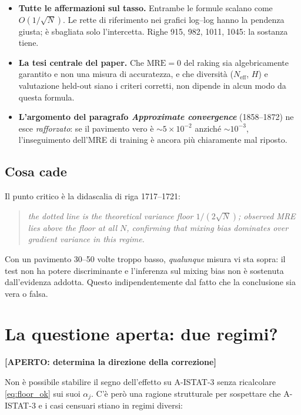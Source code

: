 \documentclass[11pt,a4paper]{article}
\newcommand{\MRE}{\mathrm{MRE}}
\newcommand{\OPEN}[1]{\textcolor{orange!80!black}{\textbf{[APERTO: #1]}}}
\begin{document}
\begin{itemize}[leftmargin=*]
\item \textbf{Tutte le affermazioni sul tasso.} Entrambe le formule
  scalano come $O(1/\sqrt{N})$. Le rette di riferimento nei grafici
  log--log hanno la pendenza giusta; è sbagliata solo l'intercetta.
  Righe 915, 982, 1011, 1045: la sostanza tiene.
\item \textbf{La tesi centrale del paper.} Che $\MRE=0$ del raking sia
  algebricamente garantito e non una misura di accuratezza, e che
  diversità ($N_{\text{eff}}$, $H$) e valutazione held-out siano i
  criteri corretti, non dipende in alcun modo da questa formula.
\item \textbf{L'argomento del paragrafo \emph{Approximate
  convergence}} (1858--1872) ne esce \emph{rafforzato}: se il
  pavimento vero è $\sim\!5\times10^{-2}$ anziché $\sim\!10^{-3}$,
  l'inseguimento dell'MRE di training è ancora più chiaramente mal
  riposto.
\end{itemize}

\subsection{Cosa cade}

Il punto critico è la didascalia di riga 1717--1721:

\begin{quote}\itshape
the dotted line is the theoretical variance floor $1/(2\sqrt{N})$;
observed MRE lies above the floor at all $N$, confirming that mixing
bias dominates over gradient variance in this regime.
\end{quote}

Con un pavimento 30--50 volte troppo basso, \emph{qualunque} misura vi
sta sopra: il test non ha potere discriminante e l'inferenza sul
mixing bias non è sostenuta dall'evidenza addotta. Questo
indipendentemente dal fatto che la conclusione sia vera o falsa.

\section{La questione aperta: due regimi?}

\OPEN{determina la direzione della correzione}

Non è possibile stabilire il segno dell'effetto su A-ISTAT-3 senza
ricalcolare \eqref{eq:floor_ok} sui suoi $\alpha_j$. C'è però una
ragione strutturale per sospettare che A-ISTAT-3 e i casi censuari
stiano in regimi diversi:
\end{document}
